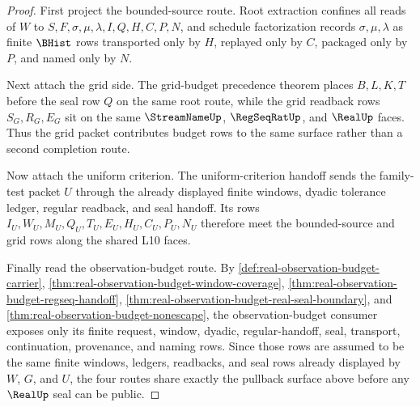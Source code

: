 \begin{proof}
First project the bounded-source route. Root extraction confines all reads of $W$ to $S,F,\sigma,\mu,\lambda,I,Q,H,C,P,N$, and schedule factorization records $\sigma,\mu,\lambda$ as finite $\BHist$ rows transported only by $H$, replayed only by $C$, packaged only by $P$, and named only by $N$.

Next attach the grid side. The grid-budget precedence theorem places $B,L,K,T$ before the seal row $Q$ on the same root route, while the grid readback rows $S_G,R_G,E_G$ sit on the same $\StreamNameUp$, $\RegSeqRatUp$, and $\RealUp$ faces. Thus the grid packet contributes budget rows to the same surface rather than a second completion route.

Now attach the uniform criterion. The uniform-criterion handoff sends the family-test packet $U$ through the already displayed finite windows, dyadic tolerance ledger, regular readback, and seal handoff. Its rows $I_U,W_U,M_U,Q_U,T_U,E_U,H_U,C_U,P_U,N_U$ therefore meet the bounded-source and grid rows along the shared L10 faces.

Finally read the observation-budget route. By \autoref{def:real-observation-budget-carrier}, \autoref{thm:real-observation-budget-window-coverage}, \autoref{thm:real-observation-budget-regseq-handoff}, \autoref{thm:real-observation-budget-real-seal-boundary}, and \autoref{thm:real-observation-budget-nonescape}, the observation-budget consumer exposes only its finite request, window, dyadic, regular-handoff, seal, transport, continuation, provenance, and naming rows. Since those rows are assumed to be the same finite windows, ledgers, readbacks, and seal rows already displayed by $W$, $G$, and $U$, the four routes share exactly the pullback surface above before any $\RealUp$ seal can be public.
\end{proof}

